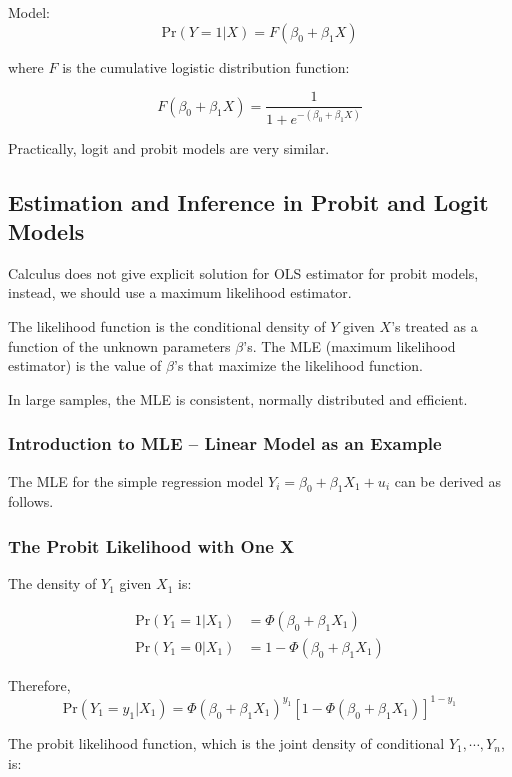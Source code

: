 \documentclass{article}
\begin{document}
Model:
\[
	\text{Pr}(Y=1 | X) = F(\beta_0 + \beta_1 X)
\]

where $F$ is the cumulative logistic distribution function:

\[
	F(\beta_0 + \beta_1 X) = \dfrac{1}{1+e^{
		-(\beta_0 + \beta_1 X)
	}}
\]

Practically, logit and probit models are very similar.

\subsection{Estimation and Inference in Probit and Logit Models}

Calculus does not give explicit solution for OLS estimator for probit models,
instead, we should use a maximum likelihood estimator.

The likelihood function is the conditional density of $Y$ given $X$'s treated as a function of the unknown parameters $\beta$'s.
The MLE (maximum likelihood estimator) is the value of $\beta$'s that maximize the likelihood function.

In large samples, the MLE is consistent, normally distributed and efficient.

\subsubsection{Introduction to MLE -- Linear Model as an Example}

The MLE for the simple regression model $Y_i = \beta_0 + \beta_1 X_1 + u_i$ can be derived as follows.



\subsubsection{The Probit Likelihood with One X}

The density of $Y_1$ given $X_1$ is:

\[
	\begin{aligned}
	\text{Pr}(Y_1 = 1|X_1) &= \Phi(\beta_0 + \beta_1 X_1)\\
	\text{Pr}(Y_1 = 0|X_1) &= 1 - \Phi(\beta_0 + \beta_1 X_1)
	\end{aligned}
\]

Therefore,
\[
	\text{Pr}(Y_1 = y_1 | X_1) = \Phi(\beta_0 + \beta_1 X_1) ^{y_1}
	\left[1 - \Phi(\beta_0 + \beta_1 X_1) \right] ^{1-y_1}
\]

The probit likelihood function\label{plf}, which is the joint density of conditional $Y_1, \cdots, Y_n$, is:
\end{document}
